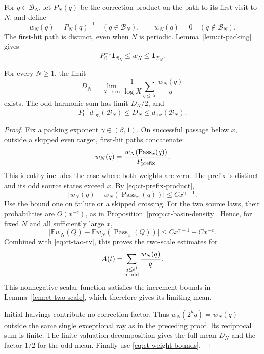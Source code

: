 For \(q\in\mathcal B_N\), let \(P_N(q)\) be the correction product
on the path to its first visit to \(N\), and define
\[
 w_N(q)=P_N(q)^{-1}\quad(q\in\mathcal B_N),\qquad
 w_N(q)=0\quad(q\notin\mathcal B_N).
\]
The first-hit path is distinct, even when \(N\) is periodic.
Lemma~\ref{lem:ct-packing} gives
\begin{equation}\label{eq:ct-weight-bounds}
 P_0^{-1}\mathbf1_{\mathcal B_N}
          \le w_N\le\mathbf1_{\mathcal B_N}.
\end{equation}

\begin{proposition}\label{prop:ct-weighted-density}
For every \(N\ge1\), the limit
\[
 D_N=\lim_{X\to\infty}\frac1{\log X}
                    \sum_{q\le X}\frac{w_N(q)}q
\]
exists. The odd harmonic sum has limit \(D_N/2\), and
\begin{equation}\label{eq:ct-D-density}
 P_0^{-1}d_{\log}(\mathcal B_N)
       \le D_N\le d_{\log}(\mathcal B_N).
\end{equation}
\end{proposition}
\begin{proof}
Fix a packing exponent \(\gamma\in(\beta,1)\).
On successful passage below \(x\), outside a skipped even target,
first-hit paths concatenate:
\[
 w_N(q)=\frac{w_N(\operatorname{Pass}_x(q))}{P_{\rm prefix}}.
\]
This identity includes the case where both weights are zero.
The prefix is distinct and its odd source states exceed \(x\).
By \eqref{eq:ct-prefix-product},
\[
 |w_N(q)-w_N(\operatorname{Pass}_x(q))|
                         \le Cx^{\gamma-1}.
\]
Use the bound one on failure or a skipped crossing. For the two
source laws, their probabilities are \(O(x^{-c})\), as in
Proposition~\ref{prop:ct-basin-density}. Hence, for fixed \(N\)
and all sufficiently large \(x\),
\[
 |\mathbb E w_N(Q)-\mathbb E w_N(\operatorname{Pass}_x(Q))|
                    \le Cx^{\gamma-1}+Cx^{-c}.
\]
Combined with \eqref{eq:ct-tao-tv}, this proves the two-scale
estimates for
\[
 A(t)=\sum_{\substack{q\le e^t\\q\ {\rm odd}}}\frac{w_N(q)}q.
\]
This nonnegative scalar function satisfies the increment bounds in
Lemma~\ref{lem:ct-two-scale}, which therefore gives its limiting mean.

Initial halvings contribute no correction factor. Thus
\(w_N(2^hq)=w_N(q)\) outside the same single exceptional ray as
in the preceding proof. Its reciprocal sum is finite. The
finite-valuation decomposition gives the full mean \(D_N\) and
the factor \(1/2\) for the odd mean. Finally use
\eqref{eq:ct-weight-bounds}.
\end{proof}

